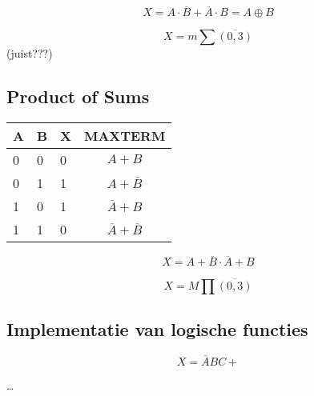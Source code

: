 \documentclass[11pt, a4paper]{article}
\begin{document}
$$X = A\cdot \overline{B} + \overline{A}\cdot B = A  \oplus  B$$

$$X = m \sum\overline{(0,3)} $$ (juist???)

\subsection{Product of Sums}

\begin{tabular}{l l l || c}
A & B & X & MAXTERM \\
\hline
0 & 0 & 0 & $A+B$ \\
0 & 1 & 1 & $A+\overline{B}$ \\
1 & 0 & 1 & $\overline{A}+B $\\
1 & 1 & 0 & $\overline{A}+\overline{B}$ \\
\end{tabular}

$$X = A+\overline{B} \cdot \overline{A}+B $$

$$X = M \prod\overline{(0,3)} $$


\subsection{Implementatie van logische functies}

$$ X = \overline{A}BC + $$

\dots

\newpage
\end{document}
